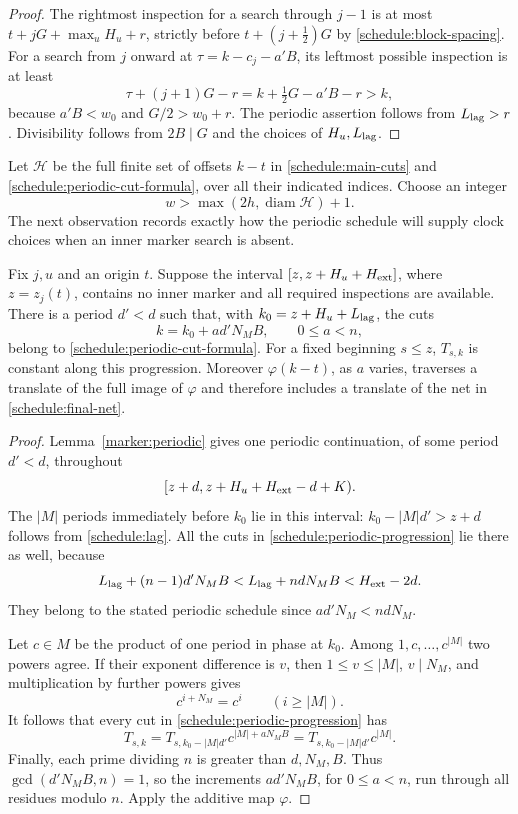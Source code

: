 \begin{proof}
The rightmost inspection for a search through $j-1$ is at most
$t+jG+\max_uH_u+r$, strictly before $t+(j+\tfrac12)G$ by
\eqref{schedule:block-spacing}.  For a search from $j$ onward at
$\tau=k-c_j-a'B$, its leftmost possible inspection is at least
\[
 \tau+(j+1)G-r=k+\tfrac12G-a'B-r>k,
\]
because $a'B<w_0$ and $G/2>w_0+r$.  The periodic assertion follows from
$L_{\rm lag}>r$.  Divisibility follows from $2B\mid G$ and the choices of
$H_u,L_{\rm lag}$.
\end{proof}

Let $\mathcal H$ be the full finite set of offsets $k-t$ in
\eqref{schedule:main-cuts} and \eqref{schedule:periodic-cut-formula}, over
all their indicated indices.  Choose an integer
\begin{equation}\label{schedule:end-stability-width}
 w>\max(2h,\operatorname{diam}\mathcal H)+1.
\end{equation}
The next observation records exactly how the periodic schedule will
supply clock choices when an inner marker search is absent.

\begin{lemma}
\label{schedule:periodic-cuts}
Fix $j,u$ and an origin $t$.  Suppose the interval
$[z,z+H_u+H_{\rm ext}]$, where $z=z_j(t)$, contains no inner marker and
all required inspections are available.  There is a period $d'<d$ such
that, with $k_0=z+H_u+L_{\rm lag}$, the cuts
\begin{equation}\label{schedule:periodic-progression}
 k=k_0+a d'N_MB,\qquad 0\le a<n,
\end{equation}
belong to \eqref{schedule:periodic-cut-formula}.  For a fixed beginning
$s\le z$, $T_{s,k}$ is constant along this progression.
Moreover $\varphi(k-t)$, as $a$ varies, traverses a translate of the full
image of $\varphi$ and therefore includes a translate of the net in
\eqref{schedule:final-net}.
\end{lemma}

\begin{proof}
Lemma~\ref{marker:periodic} gives one periodic continuation, of some
period $d'<d$, throughout
\[
 [z+d,z+H_u+H_{\rm ext}-d+K).
\]
The $|M|$ periods immediately before $k_0$ lie in this interval:
$k_0-|M|d'>z+d$ follows from \eqref{schedule:lag}.  All the cuts in
\eqref{schedule:periodic-progression} lie there as well, because
\[
 L_{\rm lag}+(n-1)d'N_MB
 <L_{\rm lag}+ndN_MB<H_{\rm ext}-2d.
\]
They belong to the stated periodic schedule since $a d'N_M<ndN_M$.

Let $c\in M$ be the product of one period in phase at $k_0$.  Among
$1,c,\ldots,c^{|M|}$ two powers agree.  If their exponent difference is
$v$, then $1\le v\le |M|$, $v\mid N_M$, and multiplication by further
powers gives
\[
 c^{i+N_M}=c^i\qquad(i\ge |M|).
\]
It follows that every cut in \eqref{schedule:periodic-progression} has
\[
 T_{s,k}
 =T_{s,k_0-|M|d'}c^{|M|+aN_MB}
 =T_{s,k_0-|M|d'}c^{|M|}.
\]
Finally, each prime dividing $n$ is greater than $d,N_M,B$.  Thus
$\gcd(d'N_MB,n)=1$, so the increments $a d'N_MB$, for $0\le a<n$, run
through all residues modulo $n$.  Apply the additive map $\varphi$.
\end{proof}

